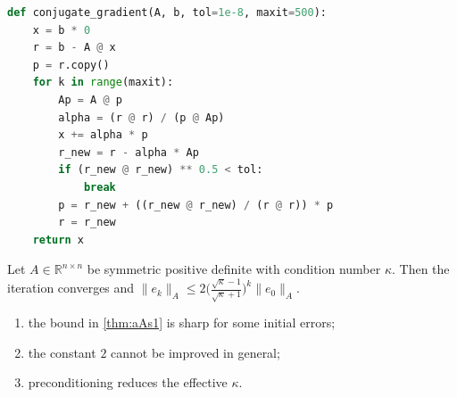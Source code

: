 \begin{lstlisting}[language=python,caption={Reference implementation for aAs1.},label={lst:aAs1}]
def conjugate_gradient(A, b, tol=1e-8, maxit=500):
    x = b * 0
    r = b - A @ x
    p = r.copy()
    for k in range(maxit):
        Ap = A @ p
        alpha = (r @ r) / (p @ Ap)
        x += alpha * p
        r_new = r - alpha * Ap
        if (r_new @ r_new) ** 0.5 < tol:
            break
        p = r_new + ((r_new @ r_new) / (r @ r)) * p
        r = r_new
    return x
\end{lstlisting}

\kant[6-11]
\begin{theorem}\label{thm:aAs1}
Let $A\in\mathbb{R}^{n\times n}$ be symmetric positive definite with condition number $\kappa$. Then the iteration converges and
$\lVert e_k\rVert_A \le 2\bigl(\tfrac{\sqrt\kappa-1}{\sqrt\kappa+1}\bigr)^k\lVert e_0\rVert_A$.
\end{theorem}
\begin{enumerate}[label=(\roman*)]
\item the bound in \cref{thm:aAs1} is sharp for some initial errors;
\item the constant $2$ cannot be improved in general;
\item preconditioning reduces the effective $\kappa$.
\end{enumerate}

\kant[5-10]
